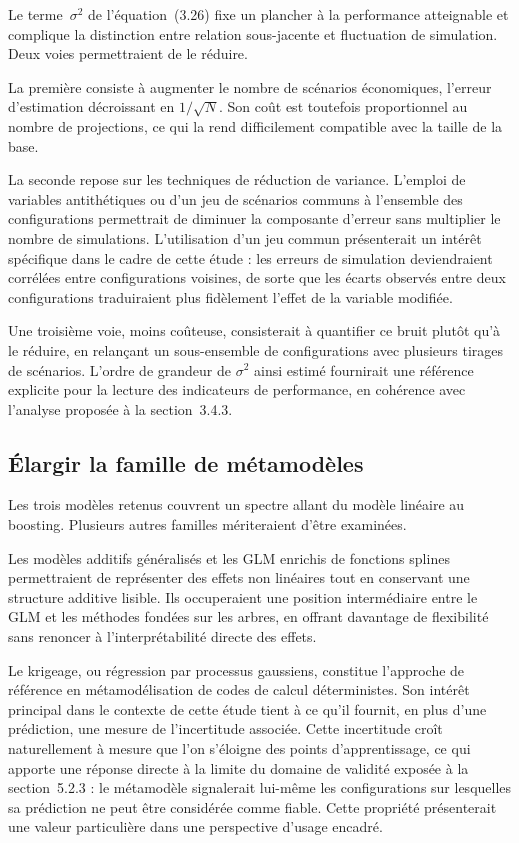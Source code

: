 Le terme~\(\sigma^2\) de l'équation~(3.26) fixe un plancher à la performance atteignable et complique la distinction entre relation sous-jacente et fluctuation de simulation. Deux voies permettraient de le réduire.

La première consiste à augmenter le nombre de scénarios économiques, l'erreur d'estimation décroissant en \(1/\sqrt{N}\). Son coût est toutefois proportionnel au nombre de projections, ce qui la rend difficilement compatible avec la taille de la base.

La seconde repose sur les techniques de réduction de variance. L'emploi de variables antithétiques ou d'un jeu de scénarios communs à l'ensemble des configurations permettrait de diminuer la composante d'erreur sans multiplier le nombre de simulations. L'utilisation d'un jeu commun présenterait un intérêt spécifique dans le cadre de cette étude : les erreurs de simulation deviendraient corrélées entre configurations voisines, de sorte que les écarts observés entre deux configurations traduiraient plus fidèlement l'effet de la variable modifiée.

Une troisième voie, moins coûteuse, consisterait à quantifier ce bruit plutôt qu'à le réduire, en relançant un sous-ensemble de configurations avec plusieurs tirages de scénarios. L'ordre de grandeur de \(\sigma^2\) ainsi estimé fournirait une référence explicite pour la lecture des indicateurs de performance, en cohérence avec l'analyse proposée à la section~3.4.3.

\subsection{Élargir la famille de métamodèles}

Les trois modèles retenus couvrent un spectre allant du modèle linéaire au boosting. Plusieurs autres familles mériteraient d'être examinées.

Les modèles additifs généralisés et les GLM enrichis de fonctions splines permettraient de représenter des effets non linéaires tout en conservant une structure additive lisible. Ils occuperaient une position intermédiaire entre le GLM et les méthodes fondées sur les arbres, en offrant davantage de flexibilité sans renoncer à l'interprétabilité directe des effets.

Le krigeage, ou régression par processus gaussiens, constitue l'approche de référence en métamodélisation de codes de calcul déterministes. Son intérêt principal dans le contexte de cette étude tient à ce qu'il fournit, en plus d'une prédiction, une mesure de l'incertitude associée. Cette incertitude croît naturellement à mesure que l'on s'éloigne des points d'apprentissage, ce qui apporte une réponse directe à la limite du domaine de validité exposée à la section~5.2.3 : le métamodèle signalerait lui-même les configurations sur lesquelles sa prédiction ne peut être considérée comme fiable. Cette propriété présenterait une valeur particulière dans une perspective d'usage encadré.

